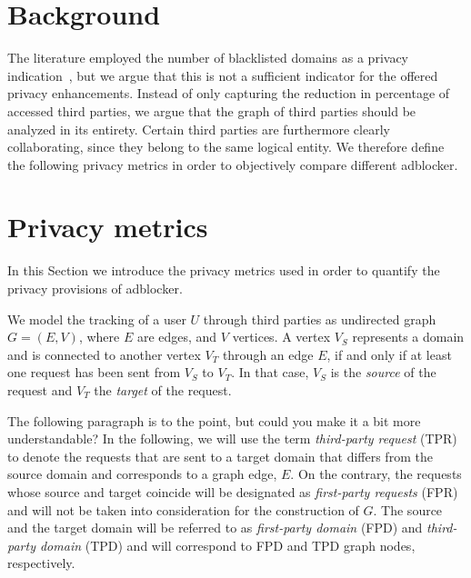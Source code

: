 \documentclass{sig-alternate}
\begin{document}
\section{Background} \label{sec:background}
The literature employed the number of blacklisted domains as a privacy indication~\cite{XX}, but we argue that this is not a sufficient indicator for the offered privacy enhancements. Instead of only capturing the reduction in percentage of accessed third parties, we argue that the graph of third parties should be analyzed in its entirety. Certain third parties are furthermore clearly collaborating, since they belong to the same logical entity. We therefore define the following privacy metrics in order to objectively compare different adblocker.

\section{Privacy metrics} \label{sec:privacy_metrics}
In this Section we introduce the privacy metrics used in order to quantify the privacy provisions of adblocker.


We model the tracking of a user $U$ through third parties as undirected graph $G=(E,V)$, where $E$ are edges, and $V$ vertices. A vertex $V_S$ represents a domain and is connected to another vertex $V_T$ through an edge $E$, if and only if at least one request has been sent from $V_S$ to $V_T$. In that case, $V_S$ is the \textit{source} of the request and $V_T$ the \textit{target} of the request.

{\color{red}The following paragraph is to the point, but could you make it a bit more understandable?}
In the following, we will use the term \textit{third-party request} (TPR) to denote the requests that are sent to a target domain that differs from the source domain and corresponds to a graph edge, $E$. On the contrary, the requests whose source and target coincide will be designated as \textit{first-party requests} (FPR) and will not be taken into consideration for the construction of $G$. The source and the target domain will be referred to as \textit{first-party domain} (FPD) and \textit{third-party domain} (TPD) and will correspond to FPD and TPD graph nodes, respectively.
\end{document}
